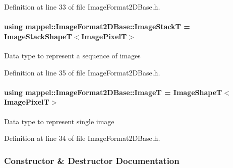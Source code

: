 Definition at line 33 of file Image\+Format2\+D\+Base.\+h.

\paragraph[{\texorpdfstring{Image\+StackT}{ImageStackT}}]{\setlength{\rightskip}{0pt plus 5cm}using {\bf mappel\+::\+Image\+Format2\+D\+Base\+::\+Image\+StackT} =  {\bf Image\+Stack\+ShapeT}$<${\bf Image\+PixelT}$>$}\hypertarget{classmappel_1_1ImageFormat2DBase_a8f0276e94ff242fa4740a718642f5e14}{}\label{classmappel_1_1ImageFormat2DBase_a8f0276e94ff242fa4740a718642f5e14}
Data type to represent a sequence of images 

Definition at line 35 of file Image\+Format2\+D\+Base.\+h.

\paragraph[{\texorpdfstring{ImageT}{ImageT}}]{\setlength{\rightskip}{0pt plus 5cm}using {\bf mappel\+::\+Image\+Format2\+D\+Base\+::\+ImageT} =  {\bf Image\+ShapeT}$<${\bf Image\+PixelT}$>$}\hypertarget{classmappel_1_1ImageFormat2DBase_a667ea5016648958e507e7db8eaa041b0}{}\label{classmappel_1_1ImageFormat2DBase_a667ea5016648958e507e7db8eaa041b0}
Data type to represent single image 

Definition at line 34 of file Image\+Format2\+D\+Base.\+h.



\subsubsection{Constructor \& Destructor Documentation}
